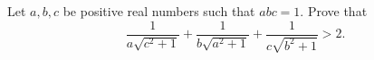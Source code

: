 Let $a, b, c$ be positive real numbers such that $abc = 1$. Prove that
$$\frac{1}{a\sqrt{c^2 + 1}} + \frac{1}{b\sqrt{a^2 + 1}} + \frac{1}{c\sqrt{b^2+1}} > 2.$$